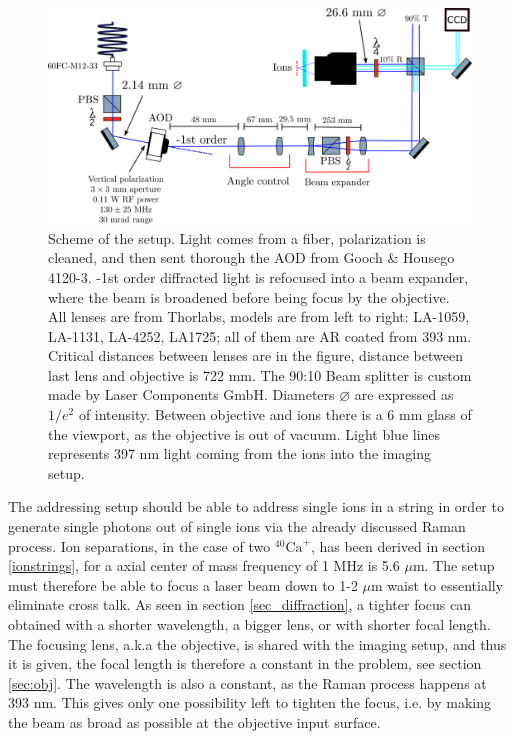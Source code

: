 \begin{figure}[H]
\centering
\includegraphics[width=\textwidth]{img/setup}
\caption{Scheme of the setup. Light comes from a fiber, polarization is cleaned, and then sent thorough the AOD from Gooch \& Housego 4120-3. -1st order diffracted light is refocused into a beam expander, where the beam is broadened before being focus by the objective. All lenses are from Thorlabs, models are from left to right: LA-1059, LA-1131, LA-4252, LA1725; all of them are AR coated from 393 nm. Critical distances between lenses are in the figure, distance between last lens and objective is 722 mm. The 90:10 Beam splitter is custom made by Laser Components GmbH. Diameters $\varnothing$ are expressed as $1/e^2$ of intensity. Between objective and ions there is a 6 mm glass of the viewport, as the objective is out of vacuum. Light blue lines represents 397 nm light coming from the ions into the imaging setup.}
\label{addressingsetup}
\end{figure}
The addressing setup should be able to address single ions in a string in order to generate single photons out of single ions via the already discussed Raman process. Ion separations, in the case of two $^{40}\text{Ca}^+$, has been derived in section \ref{ionstrings}, for a axial center of mass frequency of 1 MHz is 5.6 $\mu$m. The setup must therefore be able to focus a laser beam down to 1-2 $\mu$m waist to essentially eliminate cross talk. As seen in section \ref{sec_diffraction}, a tighter focus can obtained with a shorter wavelength, a bigger lens, or with shorter focal length. The focusing lens, a.k.a the objective, is shared with the imaging setup, and thus it is given, the focal length is therefore a constant in the problem, see section \ref{sec:obj}. The wavelength is also a constant, as the Raman process happens at 393 nm. This gives only one possibility left to tighten the focus, i.e. by making the beam as broad as possible at the objective input surface.\\

